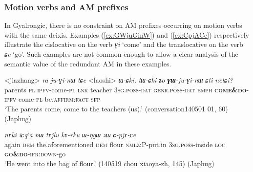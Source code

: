\documentclass[oneside,a4paper,11pt]{article}
\newcommand{\ipa}[1]{{\phon\textit{#1}}}
\newcommand{\japhug}[2]{\textit{\phon#1} `#2'}
\newcommand{\sens}[1]{‘#1’}
\newcommand{\rouge}[1]{\textbf{#1}}
\begin{document}
%
 

\subsubsection{Motion verbs and AM prefixes}
In Gyalrongic, there is no constraint on AM prefixes occurring on motion verbs with the same deixis. Examples (\ref{ex:GWjuGinW}) and (\ref{ex:CpjACe}) respectively illustrate the cislocative on the verb \japhug{ɣi}{come} and the translocative on the verb \japhug{ɕe}{go}. Such examples are not common enough to allow a clear analysis of the semantic value of the redundant AM in these examples.

\begin{exe}
\ex \label{ex:GWjuGinW}
 \gll <jiazhang> \ipa{ra}	\ipa{ju-ɣi-nɯ}	\ipa{tɕe}  <laoshi> \ipa{ɯ-ɕki,}	\ipa{tɯ-ɕki}	\ipa{ʑo}	\ipa{\rouge{ɣɯ}-ju-ɣi-nɯ}	\ipa{ɕti}	\ipa{netɕi?}  \\
 parents \textsc{pl} \textsc{ipfv}-come-\textsc{pl} \textsc{lnk} teacher \textsc{3sg}.\textsc{poss}-\textsc{dat} \textsc{genr}.\textsc{poss}-\textsc{dat} \textsc{emph} \rouge{\textsc{come\&do}}-\textsc{ipfv}-come-\textsc{pl} be.\textsc{affirm}:\textsc{fact} \textsc{sfp} \\
 \glt `The parents come, come to the teachers (us).' (conversation140501 01, 60) (Japhug)
\end{exe}

\begin{exe}
\ex \label{ex:CpjACe}
 \gll \ipa{li}	\ipa{nɤki}	\ipa{iɕqʰa}	\ipa{nɯ}	\ipa{tɤjlu}	\ipa{kɤ-rku}	\ipa{ɯ-ŋgɯ}	\ipa{zɯ}	\ipa{\rouge{ɕ}-pjɤ-ɕe} \\
 again \textsc{dem} the.aforementioned \textsc{dem} flour \textsc{nmlz}:P-put.in \textsc{3sg}.\textsc{poss}-inside \textsc{loc} \rouge{\textsc{go\&do}}-\textsc{ifr}:\textsc{down}-go \\
 \glt `He went into the bag of flour.' (140519 chou xiaoya-zh, 145) (Japhug)
\end{exe}
\end{document}
